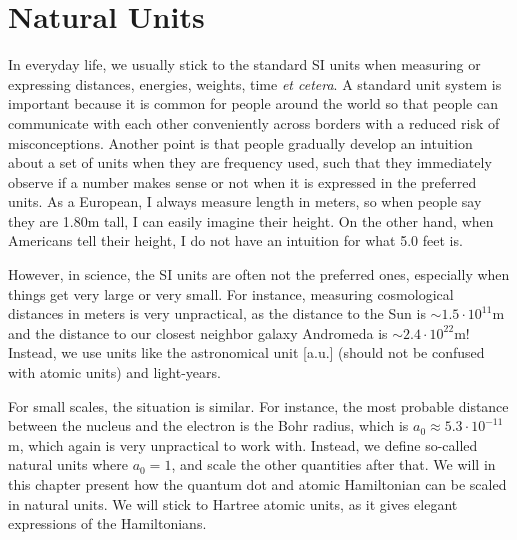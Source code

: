 \chapter{Natural Units} \label{app:units}
In everyday life, we usually stick to the standard SI units when measuring or expressing distances, energies, weights, time \textit{et cetera}. A standard unit system is important because it is common for people around the world so that people can communicate with each other conveniently across borders with a reduced risk of misconceptions. Another point is that people gradually develop an intuition about a set of units when they are frequency used, such that they immediately observe if a number makes sense or not when it is expressed in the preferred units. As a European, I always measure length in meters, so when people say they are 1.80m tall, I can easily imagine their height. On the other hand, when Americans tell their height, I do not have an intuition for what 5.0 feet is. 

However, in science, the SI units are often not the preferred ones, especially when things get very large or very small. For instance, measuring cosmological distances in meters is very unpractical, as the distance to the Sun is $\sim1.5\cdot10^{11}$m and the distance to our closest neighbor galaxy Andromeda is $\sim 2.4\cdot10^{22}$m! Instead, we use units like the astronomical unit [a.u.] (should not be confused with atomic units) and light-years. 

For small scales, the situation is similar. For instance, the most probable distance between the nucleus and the electron is the Bohr radius, which is $a_0\approx5.3\cdot10^{-11}$m, which again is very unpractical to work with. Instead, we define so-called natural units where $a_0=1$, and scale the other quantities after that. We will in this chapter present how the quantum dot and atomic Hamiltonian can be scaled in natural units. We will stick to Hartree atomic units, as it gives elegant expressions of the Hamiltonians.  

